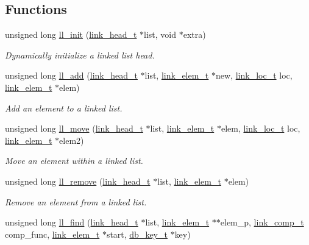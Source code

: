 \subsection*{Functions}
\begin{CompactItemize}
\item 
unsigned long \hyperlink{group__dbprim__link_ga5}{ll\_\-init} (\hyperlink{struct__link__head__s}{link\_\-head\_\-t} $\ast$list, void $\ast$extra)
\begin{CompactList}\small\item\em Dynamically initialize a linked list head. \item\end{CompactList}\item 
unsigned long \hyperlink{group__dbprim__link_ga6}{ll\_\-add} (\hyperlink{struct__link__head__s}{link\_\-head\_\-t} $\ast$list, \hyperlink{struct__link__elem__s}{link\_\-elem\_\-t} $\ast$new, \hyperlink{group__dbprim__link_ga4}{link\_\-loc\_\-t} loc, \hyperlink{struct__link__elem__s}{link\_\-elem\_\-t} $\ast$elem)
\begin{CompactList}\small\item\em Add an element to a linked list. \item\end{CompactList}\item 
unsigned long \hyperlink{group__dbprim__link_ga7}{ll\_\-move} (\hyperlink{struct__link__head__s}{link\_\-head\_\-t} $\ast$list, \hyperlink{struct__link__elem__s}{link\_\-elem\_\-t} $\ast$elem, \hyperlink{group__dbprim__link_ga4}{link\_\-loc\_\-t} loc, \hyperlink{struct__link__elem__s}{link\_\-elem\_\-t} $\ast$elem2)
\begin{CompactList}\small\item\em Move an element within a linked list. \item\end{CompactList}\item 
unsigned long \hyperlink{group__dbprim__link_ga8}{ll\_\-remove} (\hyperlink{struct__link__head__s}{link\_\-head\_\-t} $\ast$list, \hyperlink{struct__link__elem__s}{link\_\-elem\_\-t} $\ast$elem)
\begin{CompactList}\small\item\em Remove an element from a linked list. \item\end{CompactList}\item 
unsigned long \hyperlink{group__dbprim__link_ga9}{ll\_\-find} (\hyperlink{struct__link__head__s}{link\_\-head\_\-t} $\ast$list, \hyperlink{struct__link__elem__s}{link\_\-elem\_\-t} $\ast$$\ast$elem\_\-p, \hyperlink{group__dbprim__link_ga3}{link\_\-comp\_\-t} comp\_\-func, \hyperlink{struct__link__elem__s}{link\_\-elem\_\-t} $\ast$start, \hyperlink{struct__db__key__s}{db\_\-key\_\-t} $\ast$key)
$$
\end{CompactItemize}
